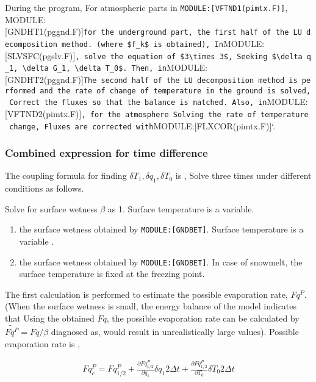 During the program, For atmospheric parts in
\texttt{MODULE:{[}VFTND1(pimtx.F){]}},
MODULE:{[}GNDHT1(pggnd.F){]}\texttt{for\ the\ underground\ part,\ the\ first\ half\ of\ the\ LU\ decomposition\ method.\ (where\ \$f\textquotesingle{}\_k\$\ is\ obtained),\ In}MODULE:{[}SLVSFC(pgslv.F){]}\texttt{,\ solve\ the\ equation\ of\ \$3\textbackslash{}times\ 3\$,\ Seeking\ \$\textbackslash{}delta\ q\_1,\ \textbackslash{}delta\ G\_1,\ \textbackslash{}delta\ T\_0\$.\ Then,\ in}MODULE:{[}GNDHT2(pggnd.F){]}\texttt{The\ second\ half\ of\ the\ LU\ decomposition\ method\ is\ performed\ and\ the\ rate\ of\ change\ of\ temperature\ in\ the\ ground\ is\ solved,\ Correct\ the\ fluxes\ so\ that\ the\ balance\ is\ matched.\ Also,\ in}MODULE:{[}VFTND2(pimtx.F){]}\texttt{,\ for\ the\ atmosphere\ Solving\ the\ rate\ of\ temperature\ change,\ Fluxes\ are\ corrected\ with}MODULE:{[}FLXCOR(pimtx.F){]}`.

\hypertarget{combined-expression-for-time-difference}{%
\subsubsection{Combined expression for time
difference}\label{combined-expression-for-time-difference}}

The coupling formula for finding \(\delta T_1, \delta q_1, \delta T_0\)
is , Solve three times under different conditions as follows.

Solve for surface wetness \(\beta\) as 1. Surface temperature is a
variable.

\begin{enumerate}
\def\labelenumi{\arabic{enumi}.}
\setcounter{enumi}{1}
\item
  the surface wetness obtained by \texttt{MODULE:{[}GNDBET{]}}. Surface
  temperature is a variable .
\item
  the surface wetness obtained by \texttt{MODULE:{[}GNDBET{]}}. In case
  of snowmelt, the surface temperature is fixed at the freezing point.
\end{enumerate}

The first calculation is performed to estimate the possible evaporation
rate, \(Fq^P\). (When the surface wetness is small, the energy balance
of the model indicates that Using the obtained \(Fq\), the possible
evaporation rate can be calculated by \(\widetilde{Fq^P} = Fq / \beta\)
diagnosed as, would result in unrealistically large values). Possible
evaporation rate is ,

\begin{eqnarray}
  Fq^P_c = Fq^P_{1/2}
       + \frac{\partial Fq^P_{1/2}}{\partial q_1} \delta q_1 2 \Delta t 
       + \frac{\partial Fq^P_{1/2}}{\partial T_0} \delta T_0 2 \Delta t 
\end{eqnarray}


